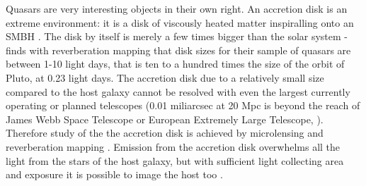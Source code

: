 \documentclass[modern]{aastex62}
\begin{document}

Quasars are very interesting objects in their own right. An accretion disk is an extreme environment: it is a disk of viscously heated matter inspiralling onto an SMBH \citep{ruan2017}. The disk by itself is merely a few times bigger than the solar system - \cite{mudd2017} finds with reverberation  mapping that disk sizes for their sample of quasars are between 1-10 light days, that is ten to a hundred times the size of the orbit of Pluto, at 0.23 light days. 
The accretion disk due to a relatively small size compared to the host galaxy cannot be resolved with even the largest currently operating or planned telescopes (0.01 miliarcsec at 20 Mpc is beyond the reach of James Webb Space Telescope or European Extremely Large Telescope, \cite{gardner2006,dioaliti2015}). Therefore study of the the accretion disk is achieved by microlensing \citep{agol1999, jimenez2012} and reverberation mapping \citep{jiang2017, mudd2017}.  Emission from the accretion disk overwhelms all the light from the stars of the host galaxy, but with sufficient light collecting area and exposure it is possible to image the host too \citep{hutchings2002,kotilainen2013, falomo2014, liuzzo2016, bayliss2017}. 
\end{document}
